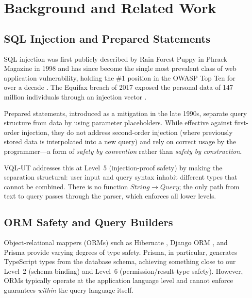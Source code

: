 \documentclass[11pt,a4paper]{article}
\newcommand{\VQL}{\textsc{VQL-UT}}
\begin{document}
\section{Background and Related Work}\label{sec:background}

\subsection{SQL Injection and Prepared Statements}

SQL injection was first publicly described by Rain Forest Puppy in
Phrack Magazine in 1998 \citep{rfp1998nt} and has since become the
single most prevalent class of web application vulnerability, holding
the \#1 position in the OWASP Top Ten for over a decade
\citep{owasp2021top10}.  The Equifax breach of 2017 exposed the
personal data of 147 million individuals through an injection vector
\citep{usgao2018equifax}.

Prepared statements, introduced as a mitigation in the late 1990s,
separate query structure from data by using parameter placeholders.
While effective against first-order injection, they do not address
second-order injection (where previously stored data is interpolated
into a new query) and rely on correct usage by the programmer---a form
of \emph{safety by convention} rather than \emph{safety by
construction}.

\VQL{} addresses this at Level~5 (injection-proof safety) by making
the separation structural: user input and query syntax inhabit
different types that cannot be combined.  There is no function
$\mathit{String} \to \mathit{Query}$; the only path from text to query
passes through the parser, which enforces all lower levels.

\subsection{ORM Safety and Query Builders}

Object-relational mappers (ORMs) such as Hibernate \citep{bauer2015java},
Django ORM \citep{holovaty2009django}, and Prisma
\citep{prisma2023docs} provide varying degrees of type safety.
Prisma, in particular, generates TypeScript types from the database
schema, achieving something close to our Level~2 (schema-binding) and
Level~6 (permission/result-type safety).  However, ORMs typically
operate at the application language level and cannot enforce
guarantees \emph{within} the query language itself.
\end{document}
